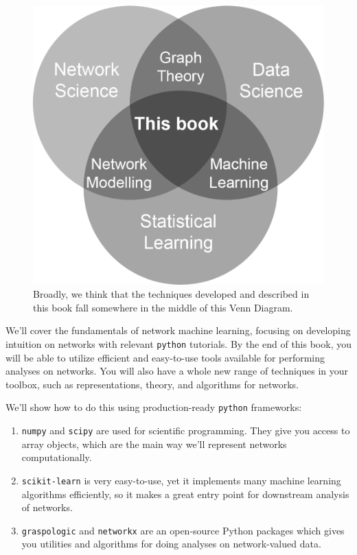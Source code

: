 \begin{figure}[h]
    \centering
    \includegraphics{Images/this_book.png}
    \caption[Venn diagram of network machine learning]{Broadly, we think that the techniques developed and described in this book fall somewhere in the middle of this Venn Diagram.}
    \label{fig:this_book}
\end{figure}

We'll cover the fundamentals of network machine learning, focusing on developing intuition on networks with relevant \texttt{python} tutorials. By the end of this book, you will be able to utilize efficient and easy-to-use tools available for performing analyses on networks. You will also have a whole new range of techniques in your toolbox, such as representations, theory, and algorithms for networks.

We'll show how to do this using production-ready \texttt{python} frameworks:
\begin{enumerate}
    \item \texttt{numpy} \cite{numpy} and \texttt{scipy} \cite{scipy} are used for scientific programming. They give you access to array objects, which are the main way we'll represent networks computationally.
    \item \texttt{scikit-learn} \cite{sklearn} is very easy-to-use, yet it implements many machine learning algorithms efficiently, so it makes a great entry point for downstream analysis of networks.
    \item \texttt{graspologic} \cite{graspologic} and \texttt{networkx} \cite{networkx} are an open-source Python packages which gives you utilities and algorithms for doing analyses on network-valued data.
\end{enumerate}

